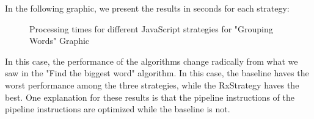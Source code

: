 In the following graphic, we present the results in seconds for each strategy:


\begin{figure}[H]
    \centering
    \caption{Processing times for different JavaScript strategies for "Grouping Words" Graphic}
    \label{fig:grouping_words_processing_times_js}
\end{figure}



In this case, the performance of the algorithms change radically from what we saw in the "Find the biggest word" algorithm. In this case, the baseline haves the worst performance among the three strategies, while the RxStrategy haves the best. 
One explanation for these results is that the pipeline instructions of the pipeline instructions are optimized while the baseline is not. 